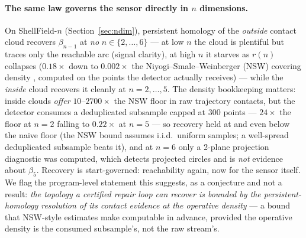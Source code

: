 \documentclass[11pt]{article}
\theoremstyle{remark}
\begin{document}
\paragraph{The same law governs the sensor directly in $n$ dimensions.} On
ShellField-$n$ (Section~\ref{sec:ndim}), persistent homology of the
\emph{outside} contact cloud recovers $\beta_{n-1}$ at \emph{no}
$n \in \{2,\ldots,6\}$ --- at low $n$ the cloud is plentiful but traces only
the reachable arc (signal clarity), at high $n$ it starves as $r(n)$
collapses ($0.18\times$ down to $0.002\times$ the
Niyogi--Smale--Weinberger (NSW) covering density
\citep{niyogi2008finding},
computed on the points the detector actually receives) --- while the
\emph{inside} cloud recovers it cleanly at $n = 2,\ldots,5$. The density
bookkeeping matters: inside clouds \emph{offer} $10$--$2700\times$ the
NSW floor in raw trajectory contacts, but the detector consumes a
deduplicated subsample capped at $300$ points --- $24\times$ the floor at
$n = 2$ falling to $0.22\times$ at $n = 5$ --- so recovery held at and
even below the naive floor (the NSW bound assumes i.i.d.\ uniform
samples; a well-spread deduplicated subsample beats it), and at $n = 6$
only a 2-plane projection diagnostic was computed, which detects
projected circles and is \emph{not} evidence about $\beta_5$. Recovery is
start-governed: reachability again, now for the sensor itself. We flag the
program-level statement this suggests, as a conjecture and not a result:
\emph{the topology a certified repair loop can recover is bounded by the
persistent-homology resolution of its contact evidence at the operative
density} --- a bound that NSW-style estimates make computable in advance,
provided the operative density is the consumed subsample's, not the raw
stream's.
\end{document}
